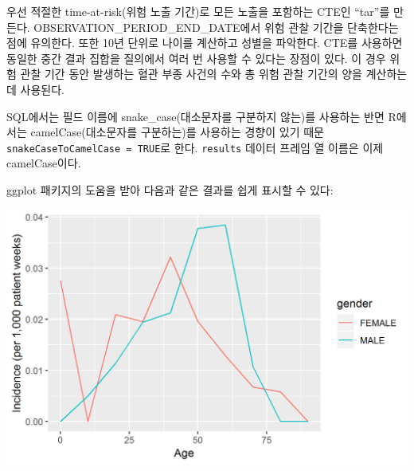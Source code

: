 \documentclass[11pt]{book}
\newenvironment{Shaded}{\begin{snugshade}}{\end{snugshade}}
\newcommand{\KeywordTok}[1]{\textcolor[rgb]{0.13,0.29,0.53}{\textbf{#1}}}
\newcommand{\DataTypeTok}[1]{\textcolor[rgb]{0.13,0.29,0.53}{#1}}
\newcommand{\DecValTok}[1]{\textcolor[rgb]{0.00,0.00,0.81}{#1}}
\newcommand{\StringTok}[1]{\textcolor[rgb]{0.31,0.60,0.02}{#1}}
\newcommand{\CommentTok}[1]{\textcolor[rgb]{0.56,0.35,0.01}{\textit{#1}}}
\newcommand{\OperatorTok}[1]{\textcolor[rgb]{0.81,0.36,0.00}{\textbf{#1}}}
\newcommand{\NormalTok}[1]{#1}
\theoremstyle{definition}
\theoremstyle{definition}
\theoremstyle{definition}
\theoremstyle{remark}
\begin{document}
우선 적절한 time-at-risk(위험 노출 기간)로 모든 노출을 포함하는 CTE인
``tar''를 만든다. OBSERVATION\_PERIOD\_END\_DATE에서 위험 관찰 기간을
단축한다는 점에 유의한다. 또한 10년 단위로 나이를 계산하고 성별을
파악한다. CTE를 사용하면 동일한 중간 결과 집합을 질의에서 여러 번 사용할
수 있다는 장점이 있다. 이 경우 위험 관찰 기간 동안 발생하는 혈관 부종
사건의 수와 총 위험 관찰 기간의 양을 계산하는 데 사용된다.

SQL에서는 필드 이름에 snake\_case(대소문자를 구분하지 않는)를 사용하는
반면 R에서는 camelCase(대소문자를 구분하는)를 사용하는 경향이 있기 때문
\texttt{snakeCaseToCamelCase\ =\ TRUE}로 한다. \texttt{results} 데이터
프레임 열 이름은 이제 camelCase이다.

ggplot 패키지의 도움을 받아 다음과 같은 결과를 쉽게 표시할 수 있다:

\begin{Shaded}
\end{Shaded}

\begin{center}\includegraphics[width=0.8\linewidth]{images/SqlAndR/ir} \end{center}
\end{document}
